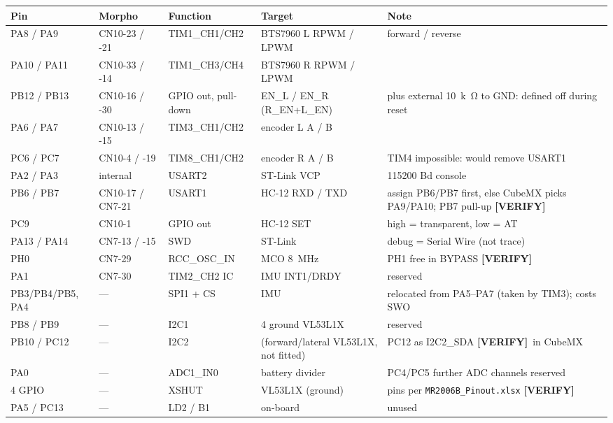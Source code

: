 \documentclass[11pt,a4paper]{article}
\newcommand{\mk}[2]{\textsf{\scriptsize\bfseries\colorbox{#1bg}{\color{#1}[#2]}}}
\newcommand{\VERIFY}{\mk{cold}{VERIFY}}
\newcommand{\code}[1]{\texttt{\small #1}}
\begin{document}
\begin{center}
\footnotesize
\begin{tabularx}{\textwidth}{@{}P{18mm}P{19mm}P{27mm}P{29mm}L@{}}
\toprule
\textbf{Pin} & \textbf{Morpho} & \textbf{Function} & \textbf{Target} & \textbf{Note}\\
\midrule
PA8 / PA9   & CN10-23 / -21 & TIM1\_CH1/CH2 & BTS7960 L RPWM / LPWM & forward / reverse\\
PA10 / PA11 & CN10-33 / -14 & TIM1\_CH3/CH4 & BTS7960 R RPWM / LPWM & \\
PB12 / PB13 & CN10-16 / -30 & GPIO out, pull-down & EN\_L / EN\_R (R\_EN+L\_EN) & plus external \qty{10}{k\ohm} to GND: defined off during reset\\
PA6 / PA7   & CN10-13 / -15 & TIM3\_CH1/CH2 & encoder L A / B & \\
PC6 / PC7   & CN10-4 / -19  & TIM8\_CH1/CH2 & encoder R A / B & TIM4 impossible: would remove USART1\\
PA2 / PA3   & internal      & USART2 & ST-Link VCP & 115200 Bd console\\
PB6 / PB7   & CN10-17 / CN7-21 & USART1 & HC-12 RXD / TXD & assign PB6/PB7 first, else CubeMX picks PA9/PA10; PB7 pull-up \VERIFY\\
PC9         & CN10-1        & GPIO out & HC-12 SET & high = transparent, low = AT\\
PA13 / PA14 & CN7-13 / -15  & SWD & ST-Link & debug = Serial Wire (not trace)\\
PH0         & CN7-29        & RCC\_OSC\_IN & MCO \qty{8}{MHz} & PH1 free in BYPASS \VERIFY\\
PA1         & CN7-30        & TIM2\_CH2 IC & IMU INT1/DRDY & reserved\\
PB3/PB4/PB5, PA4 & --- & SPI1 + CS & IMU & relocated from PA5--PA7 (taken by TIM3); costs SWO\\
PB8 / PB9   & --- & I2C1 & 4 ground VL53L1X & reserved\\
PB10 / PC12 & --- & I2C2 & (forward/lateral VL53L1X, not fitted) & PC12 as I2C2\_SDA \VERIFY\ in CubeMX\\
PA0         & --- & ADC1\_IN0 & battery divider & PC4/PC5 further ADC channels reserved\\
4 GPIO      & --- & XSHUT & VL53L1X (ground) & pins per \code{MR2006B\_Pinout.xlsx} \VERIFY\\
PA5 / PC13  & --- & LD2 / B1 & on-board & unused\\
\bottomrule
\end{tabularx}
\end{center}
\end{document}

